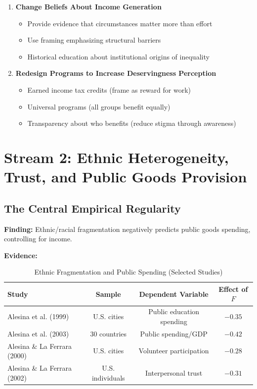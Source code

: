 \begin{enumerate}
\item \textbf{Change Beliefs About Income Generation}
   \begin{itemize}
   \item Provide evidence that circumstances matter more than effort
   \item Use framing emphasizing structural barriers
   \item Historical education about institutional origins of inequality
   \end{itemize}

\item \textbf{Redesign Programs to Increase Deservingness Perception}
   \begin{itemize}
   \item Earned income tax credits (frame as reward for work)
   \item Universal programs (all groups benefit equally)
   \item Transparency about who benefits (reduce stigma through awareness)
   \end{itemize}

\end{enumerate}

\clearpage


\section{Stream 2: Ethnic Heterogeneity, Trust, and Public Goods Provision}
\label{sec:alesina-heterogeneity}

\subsection{The Central Empirical Regularity}

\textbf{Finding:} Ethnic/racial fragmentation negatively predicts public goods spending, controlling for income.

\textbf{Evidence:}

\begin{table}[h]
\centering
\caption{Ethnic Fragmentation and Public Spending (Selected Studies)}
\label{tab:alesina-heterogeneity}
\begin{tabular}{lccc}
\toprule
\textbf{Study} & \textbf{Sample} & \textbf{Dependent Variable} & \textbf{Effect of $F$} \\
\midrule
Alesina et al. (1999) & U.S. cities & Public education spending & $-0.35$ \\
Alesina et al. (2003) & 30 countries & Public spending/GDP & $-0.42$ \\
Alesina \& La Ferrara (2000) & U.S. cities & Volunteer participation & $-0.28$ \\
Alesina \& La Ferrara (2002) & U.S. individuals & Interpersonal trust & $-0.31$ \\
\bottomrule
\end{tabular}
\end{table}

